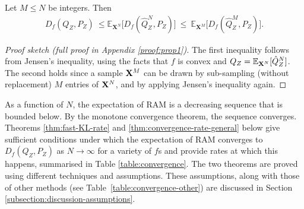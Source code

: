 \begin{proposition}\label{prop:upper-bound}
Let $M \leq N$ be integers. Then
\begin{align}
\label{eq:our-estimate}
    D_f(Q_Z , P_Z) \ \leq 
    \mathbb{E}_{\mathbf{X}^N} \bigl[D_f(\hat{Q}_Z^N , P_Z)\bigr] \  \leq \ \mathbb{E}_{\mathbf{X}^M} \bigl[D_f(\hat{Q}_Z^M , P_Z)\bigr].
\end{align}
\end{proposition}
\begin{proof}[Proof sketch (full proof in Appendix \ref{proof:prop1})]
The first inequality follows from Jensen's inequality, using the facts that $f$ is convex and ${Q_Z = \mathbb{E}_{\mathbf{X}^N} [\hat{Q}_Z^N}]$.
The second holds since a sample ${\mathbf{X}^M}$ can be drawn by sub-sampling (without replacement) $M$ entries of ${\mathbf{X}^N}$, and by applying Jensen's inequality again.
\end{proof}

As a function of $N$, the expectation of RAM is a decreasing sequence that is bounded below.
By the monotone convergence theorem, the sequence converges.
Theorems \ref{thm:fast-KL-rate} and \ref{thm:convergence-rate-general} below give sufficient conditions under which the expectation of RAM converges to $D_f(Q_{Z} , P_Z)$ as $N\to\infty$ for a variety of $f$s and provide rates at which this happens, summarised in Table \ref{table:convergence}.
The two theorems are proved using different techniques and assumptions. 
These assumptions, along with those of other methods (see Table~\ref{table:convergence-other}) are discussed in Section \ref{subsection:discussion-assumptions}.



\medskip


